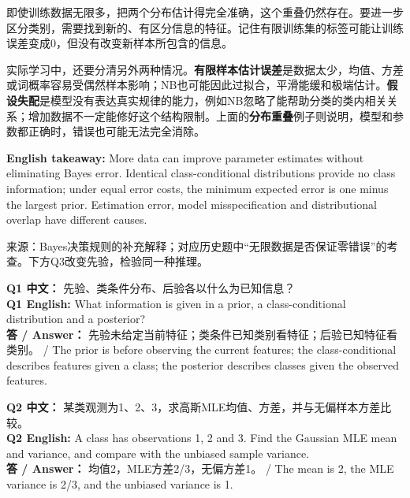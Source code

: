 即使训练数据无限多，把两个分布估计得完全准确，这个重叠仍然存在。要进一步区分类别，需要找到新的、有区分信息的特征。记住有限训练集的标签可能让训练误差变成0，但没有改变新样本所包含的信息。


实际学习中，还要分清另外两种情况。\textbf{有限样本估计误差}是数据太少，均值、方差或词概率容易受偶然样本影响；NB也可能因此过拟合，平滑能缓和极端估计。\textbf{假设失配}是模型没有表达真实规律的能力，例如NB忽略了能帮助分类的类内相关关系；增加数据不一定能修好这个结构限制。上面的\textbf{分布重叠}例子则说明，模型和参数都正确时，错误也可能无法完全消除。


\textbf{English takeaway:} More data can improve parameter estimates without eliminating Bayes error. Identical class-conditional distributions provide no class information; under equal error costs, the minimum expected error is one minus the largest prior. Estimation error, model misspecification and distributional overlap have different causes.


来源：Bayes决策规则的补充解释；对应历史题中“无限数据是否保证零错误”的考查。下方Q3改变先验，检验同一种推理。








\textbf{Q1 中文：} 先验、类条件分布、后验各以什么为已知信息？\\

\textbf{Q1 English:} What information is given in a prior, a class-conditional distribution and a posterior?\\

\textbf{答 / Answer：} 先验未给定当前特征；类条件已知类别看特征；后验已知特征看类别。 / The prior is before observing the current features; the class-conditional describes features given a class; the posterior describes classes given the observed features.


\textbf{Q2 中文：} 某类观测为1、2、3，求高斯MLE均值、方差，并与无偏样本方差比较。\\

\textbf{Q2 English:} A class has observations 1, 2 and 3. Find the Gaussian MLE mean and variance, and compare with the unbiased sample variance.\\

\textbf{答 / Answer：} 均值2，MLE方差2/3，无偏方差1。 / The mean is 2, the MLE variance is 2/3, and the unbiased variance is 1.


